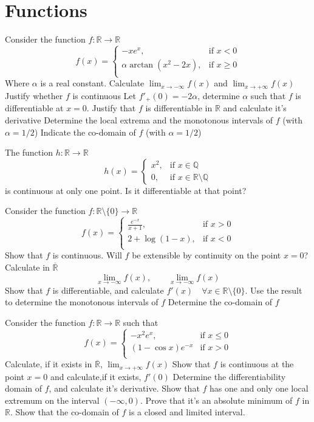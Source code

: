 \documentclass[12pt]{article}
\begin{document}
\section{Functions}
\begin{ExerciseList}
	\Exercise Consider the function $f\colon \mathbb R \to \mathbb R$
	$$f(x) = \begin{cases} -x e^x, & \mbox{if $x<0$} \\ \alpha\arctan(x^2-2x), &\mbox{if $x\ge 0$} \\ \end{cases}$$
	Where $\alpha$ is a real constant.
	\Question Calculate $\lim_{x\to -\infty}f(x)$ and $\lim_{x\to +\infty}f(x)$
	\Question Justify whether $f$ is continuous
	\Question Let $f'_+(0)=-2\alpha$, determine $\alpha$ such that $f$ is differentiable at $x=0$. Justify that $f$ is differentiable in $\mathbb R$ and calculate it's derivative
	\Question Determine the local extrema and the monotonous intervals of $f$ (with $\alpha = 1/2$)
	\Question Indicate the co-domain of $f$ (with $\alpha=1/2$)

	\Exercise The function $h\colon \mathbb R \to \mathbb R$
	$$h(x)=\begin{cases}x^2, & \mbox{if $x\in\mathbb Q$} \\ 0, & \mbox{if $x\in\mathbb R\setminus\mathbb Q$}\end{cases}$$
	is continuous at only one point. Is it differentiable at that point?

	\Exercise Consider the function $f\colon \mathbb R\setminus\{0\}\to\mathbb R$
	$$f(x) = \begin{cases} \frac{e^{-x}}{x+1}, & \mbox{if $x>0$} \\ 2+\log(1-x), & \mbox{if $x<0$} \\ \end{cases}$$
	\Question Show that $f$ is continuous. Will $f$ be extensible by continuity on the point $x=0$?
	\Question Calculate in $\overline{\mathbb R}$
	$$\lim_{x\to -\infty}f(x), \qquad \lim_{x\to -\infty}f(x)$$
	\Question Show that $f$ is differentiable, and calculate $f'(x)\quad\forall x\in\mathbb R\setminus \{ 0\}$.
	Use the result to determine the monotonous intervals of $f$
	\Question Determine the co-domain of $f$

	\Exercise Consider the function $f\colon \mathbb R\to \mathbb R$ such that
	$$f(x)=\begin{cases}-x^2e^x, & \mbox{if $x\le 0$} \\ (1-\cos x)e^{-x} & \mbox{if $x>0$} \\ \end{cases}$$
	\Question Calculate, if it exists in $\overline{\mathbb R}$, $\lim_{x\to +\infty}f(x)$
	\Question Show that $f$ is continuous at the point $x=0$ and calculate,if it exists, $f'(0)$
	\Question Determine the differentiability domain of $f$, and calculate it's derivative.
	\Question Show that $f$ has one and only one local extremum on the interval $(-\infty, 0)$.
	Prove that it's an absolute minimum of $f$ in $\mathbb R$.
	\Question Show that the co-domain of $f$ is a closed and limited interval.
\end{ExerciseList}
\end{document}
